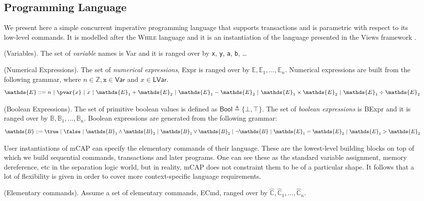 \subsection{Programming Language}
\label{language}

We present here a simple concurrent imperative programming language that supports transactions and is parametric with respect to its low-level commands. It is modelled after the \textsc{While} language and it is an instantiation of the language presented in the Views framework \cite{views}.

\begin{defn}
	(Variables).
	The set of \emph{variable} names is \textsf{Var} and it is ranged over by \texttt{x}, \texttt{y}, \texttt{a}, \texttt{b}, \ldots
\end{defn}

\begin{defn}
	(Numerical Expressions).
	The set of \emph{numerical expressions}, \textsf{Expr} is ranged over by $\mathds{E}, \mathds{E}_1, \ldots, \mathds{E}_n$. Numerical expressions are built from the following grammar, where $n \in \mathds{Z}, \mathtt{x} \in \mathsf{Var}$ and $x \in \mathsf{LVar}$.
	\[
		\mathds{E} ::=
			n\
			|\ \pvar{x}\
			|\ x\
			|\ \mathds{E}_1 + \mathds{E}_2\
			|\ \mathds{E}_1 - \mathds{E}_2\
			|\ \mathds{E}_1 \times \mathds{E}_2\
			|\ \mathds{E}_1 \div \mathds{E}_2
	\]
\end{defn}

\begin{defn}
	(Boolean Expressions).
	The set of primitive boolean values is defined as $\mathsf{Bool} \triangleq \{ \bot, \top \}$. The set of \emph{boolean expressions} is \textsf{BExpr} and it is ranged over by $\mathds{B}, \mathds{B}_1, \ldots, \mathds{B}_n$. Boolean expressions are generated from the following grammar:
	\[
		\mathds{B} ::=
			\true\
			|\ \false\
			|\ \mathds{B}_1 \land \mathds{B}_2\
			|\ \mathds{B}_1 \lor \mathds{B}_2\
			|\ \lnot \mathds{B}\
			|\ \mathds{E}_1 = \mathds{E}_2\
			|\ \mathds{E}_1 > \mathds{E}_2
	\]
\end{defn}

User instantiations of mCAP can specify the elementary commands of their language. These are the lowest-level building blocks on top of which we build sequential commands, transactions and later programs. One can see these as the standard variable assignment, memory dereference, etc in the separation logic world, but in reality, mCAP does not constraint them to be of a particular shape. It follows that a lot of flexibility is given in order to cover more context-specific language requirements.
\begin{param}
	\label{param:ecmd}
	(Elementary commands).
	Assume a set of elementary commands, \textsf{ECmd}, ranged over by $\hat{\mathds{C}}, \hat{\mathds{C}}_1, \ldots, \hat{\mathds{C}}_n$.
\end{param}

